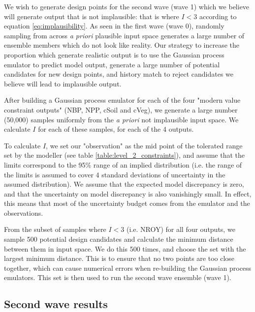 \documentclass[gmd, manuscript]{copernicus}
\begin{document}
We wish to generate design points for the second wave (wave 1) which we believe will generate output that is not implausible: that is where $I<3$ according to equation \ref{eq:implausibility}. As seen in the first wave (wave 0), randomly sampling from across \emph{a priori} plausible input space generates a large number of ensemble members which do not look like reality. Our strategy to increase the proportion which generate realistic output is to use the Gaussian process emulator to predict model output, generate a large number of potential candidates for new design points, and history match to reject candidates we believe will lead to implausible output.

After building a Gaussian process emulator for each of the four "modern value constraint outputs" (NBP, NPP, cSoil and cVeg), we generate a large number (50,000) samples uniformly from the \emph{a priori} not implausible input space. We calculate $I$ for each of these samples, for each of the 4 outputs. 

To calculate $I$, we set our "observation" as the mid point of the tolerated range set by the modeller (see table \ref{table:level_2_constraints}), and assume that the limits correspond to the 95\% range of an implied distribution (i.e. the range of the limits is assumed to cover 4 standard deviations of uncertainty in the assumed distribution). We assume that the expected model discrepancy is zero, and that the uncertainty on model discrepancy is also vanishingly small. In effect, this means that most of the uncertainty budget comes from the emulator and the observations.

From the subset of samples where $I < 3$ (i.e. NROY) for all four outputs, we sample 500 potential design candidates and calculate the minimum distance between them in input space. We do this 500 times, and choose the set with the largest minimum distance. This is to ensure that no two points are too close together, which can cause numerical errors when re-building the Gaussian process emulators. This set is then used to run the second wave ensemble (wave 1).

\subsection{Second wave results}\label{ssec:second_wave_results}
\end{document}
